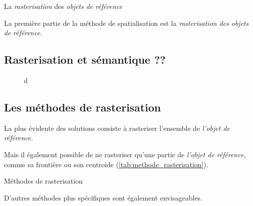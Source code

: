 La \emph{rasterisation} des \emph{objets de référence}

La première partie de la méthode de spatialisation est la
\emph{rasterisation des objets de référence.}



\subsection{Rasterisation et sémantique ??}




\begin{figure}
  \centering
  
  \caption{d}
  \label{fig:rasterisation_sel_pixels}
\end{figure}


\subsection{Les méthodes de rasterisation}



La plus évidente des solutions consiste à rasteriser l'ensemble de
\emph{l'objet de référence.}


Mais il également possible de ne rasteriser qu'une partie de
\emph{l'objet de référence,} comme sa frontière ou son centroide
(\autoref{tab:methode_rasterisation}).

\begin{table}
  \centering
  
  \caption{Méthodes de rasterisation}
  \label{tab:methode_rasterisation}
\end{table}


D'autres méthodes plus spécifiques sont également envisageables.

